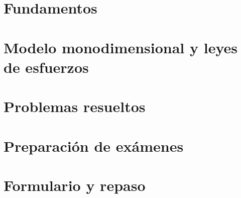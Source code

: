 \documentclass[11pt,a4paper,openany]{book}
\begin{document}
\hypersetup{pageanchor=false}



\hypersetup{pageanchor=true}

\frontmatter




\tableofcontents
\cleardoublepage
{}
\listoffigures
\cleardoublepage
{}
\listoftables
\cleardoublepage

\mainmatter
\part{Fundamentos}


\part{Modelo monodimensional y leyes de esfuerzos}


\part{Problemas resueltos}


\part{Preparación de exámenes}


\part{Formulario y repaso}


\appendix





\backmatter

\printindex
\end{document}
